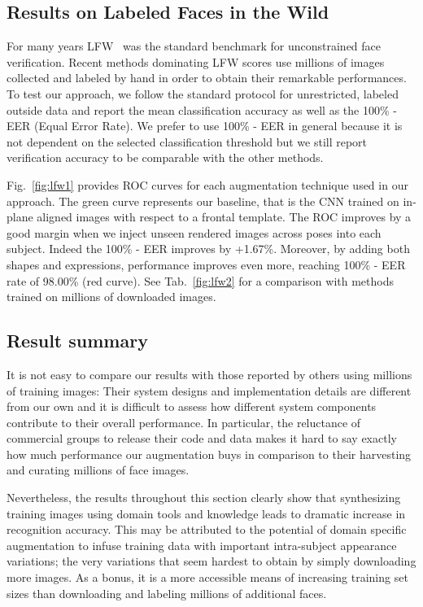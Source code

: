\documentclass[runningheads]{llncs}
\newcommand{\minisection}[1]{\vspace{0.04in} \noindent {\bf #1:} }
\begin{document}
\subsection{Results on Labeled Faces in the Wild}\label{sec:lfw}
For many years LFW~\cite{LFWTech} was the standard benchmark for unconstrained face verification. Recent methods dominating LFW scores use millions of images collected and labeled by hand in order to obtain their remarkable performances. To test our approach, we follow the standard protocol for unrestricted, labeled outside data and report the mean classification accuracy as well as the 100\% - EER (Equal Error Rate). We prefer to use 100\% - EER in general because it is not dependent on the selected classification threshold but we still report verification accuracy to be comparable with the other methods.


\minisection{Improvement for each augmentation}
Fig.~\ref{fig:lfw1} provides ROC curves for each augmentation technique used in our approach. The green curve represents our baseline, that is the CNN trained on in-plane aligned images with respect to a frontal template. The ROC improves by a good margin when we inject unseen rendered images across poses into each subject. Indeed the 100\% - EER improves by +1.67\%. Moreover, by adding both shapes and expressions, performance improves even more, reaching 100\% - EER rate of 98.00\% (red curve).  See Tab.~\ref{fig:lfw2} for a comparison with methods trained on millions of downloaded images.


\subsection{Result summary}\label{sec:summary}
It is not easy to compare our results with those reported by others using millions of training images: Their system designs and implementation details are different from our own  and it is difficult to assess how different system components contribute to their overall performance. In particular, the reluctance of commercial groups to release their code and data makes it hard to say exactly how much performance our augmentation buys in comparison to their harvesting and curating millions of face images. 

Nevertheless, the results throughout this section clearly show that synthesizing training images using domain tools and knowledge leads to dramatic increase in recognition accuracy. This may be attributed to the potential of domain specific augmentation to infuse training data with important intra-subject appearance variations; the very variations that seem  hardest to obtain by simply downloading more images. As a bonus, it is a more accessible means of increasing training set sizes than downloading and labeling millions of additional faces. 
\end{document}
